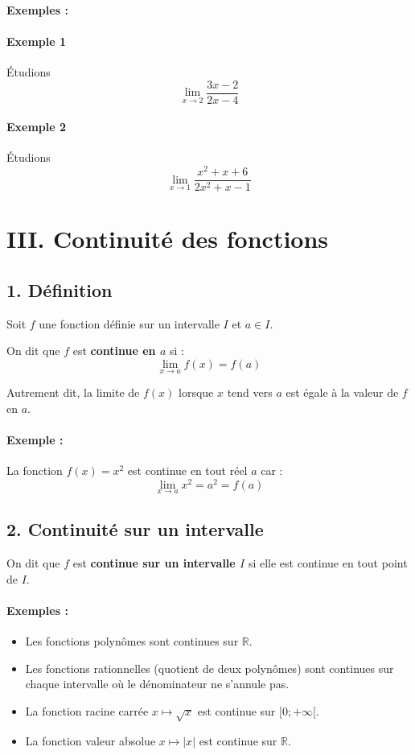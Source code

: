 \documentclass[12pt,a4paper]{article}
\begin{document}
\paragraph{Exemples :}

\paragraph{Exemple 1}
Étudions 
\[
\lim_{x \to 2} \frac{3x - 2}{2x - 4}
\]

\paragraph{Exemple 2}
Étudions 
\[
\lim_{x \to 1} \frac{x^2 + x + 6}{2x^2 + x - 1}
\]

\section*{\color{myred}III. Continuité des fonctions}

\subsection*{\color{myred}1. Définition}

Soit \( f \) une fonction définie sur un intervalle \( I \) et \( a \in I \).

On dit que \( f \) est \textbf{continue en \( a \)} si :
\[
\lim_{x \to a} f(x) = f(a)
\]

Autrement dit, la limite de \( f(x) \) lorsque \( x \) tend vers \( a \) est égale à la valeur de \( f \) en \( a \).

\paragraph{Exemple :}
La fonction \( f(x) = x^2 \) est continue en tout réel \( a \) car :
\[
\lim_{x \to a} x^2 = a^2 = f(a)
\]

\subsection*{\color{myred}2. Continuité sur un intervalle}

On dit que \( f \) est \textbf{continue sur un intervalle \( I \)} si elle est continue en tout point de \( I \).

\paragraph{Exemples :}
\begin{itemize}
    \item Les fonctions polynômes sont continues sur \( \mathbb{R} \).
    \item Les fonctions rationnelles (quotient de deux polynômes) sont continues sur chaque intervalle où le dénominateur ne s'annule pas.
    \item La fonction racine carrée \( x \mapsto \sqrt{x} \) est continue sur \( [0; +\infty[ \).
    \item La fonction valeur absolue \( x \mapsto |x| \) est continue sur \( \mathbb{R} \).
\end{itemize}
\end{document}
